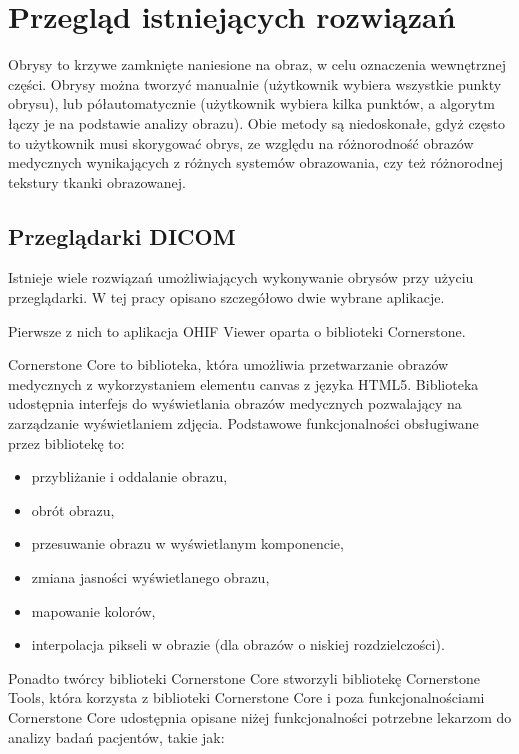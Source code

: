 \documentclass[a4paper,11pt,twoside,openright]{report}
\theoremstyle{definition}
\begin{document}
\section {Przegląd istniejących rozwiązań}

Obrysy to krzywe zamknięte naniesione na obraz, w celu oznaczenia wewnętrznej części.
Obrysy można tworzyć manualnie (użytkownik wybiera wszystkie punkty obrysu), lub
półautomatycznie (użytkownik wybiera kilka punktów, a algorytm łączy je na podstawie
analizy obrazu). Obie metody są niedoskonałe, gdyż często to użytkownik musi skorygować
obrys, ze względu na różnorodność obrazów medycznych wynikających z różnych systemów
obrazowania, czy też różnorodnej tekstury tkanki obrazowanej.

\subsection {Przeglądarki DICOM}

Istnieje wiele rozwiązań umożliwiających wykonywanie obrysów przy użyciu przeglądarki.
W tej pracy opisano szczegółowo dwie wybrane aplikacje.

Pierwsze z nich to aplikacja OHIF Viewer oparta o biblioteki Cornerstone.

Cornerstone Core \cite{Cornerstone Core} to biblioteka, która umożliwia przetwarzanie
obrazów medycznych z wykorzystaniem elementu canvas z języka HTML5. Biblioteka
udostępnia interfejs do wyświetlania obrazów medycznych pozwalający na zarządzanie
wyświetlaniem zdjęcia. Podstawowe funkcjonalności obsługiwane przez bibliotekę to:

\begin{itemize}[noitemsep]
\item przybliżanie i oddalanie obrazu,
\item obrót obrazu,
\item przesuwanie obrazu w wyświetlanym komponencie,
\item zmiana jasności wyświetlanego obrazu,
\item mapowanie kolorów,
\item interpolacja pikseli w obrazie (dla obrazów o niskiej rozdzielczości).
\end{itemize}

Ponadto twórcy biblioteki Cornerstone Core stworzyli bibliotekę Cornerstone Tools,
która korzysta z biblioteki Cornerstone Core i poza funkcjonalnościami
Cornerstone Core udostępnia opisane niżej funkcjonalności
potrzebne lekarzom do analizy badań pacjentów, takie jak:
\end{document}
